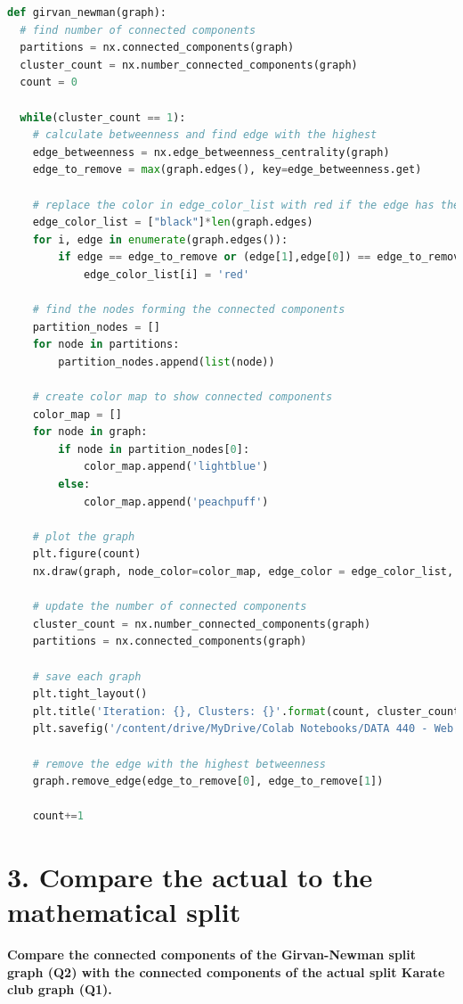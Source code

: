 \documentclass[12pt]{article}
\begin{document}
\begin{lstlisting}[language=Python, caption=Girvan-Newman algorithm function, label=lst:copy]
def girvan_newman(graph):
  # find number of connected components
  partitions = nx.connected_components(graph)
  cluster_count = nx.number_connected_components(graph)
  count = 0

  while(cluster_count == 1):
    # calculate betweenness and find edge with the highest
    edge_betweenness = nx.edge_betweenness_centrality(graph)
    edge_to_remove = max(graph.edges(), key=edge_betweenness.get)
    
    # replace the color in edge_color_list with red if the edge has the maximum betweenness:
    edge_color_list = ["black"]*len(graph.edges)
    for i, edge in enumerate(graph.edges()):
        if edge == edge_to_remove or (edge[1],edge[0]) == edge_to_remove:
            edge_color_list[i] = 'red'

    # find the nodes forming the connected components
    partition_nodes = []
    for node in partitions:
        partition_nodes.append(list(node))

    # create color map to show connected components
    color_map = []
    for node in graph:
        if node in partition_nodes[0]:
            color_map.append('lightblue')
        else: 
            color_map.append('peachpuff') 

    # plot the graph
    plt.figure(count)
    nx.draw(graph, node_color=color_map, edge_color = edge_color_list, with_labels=True)

    # update the number of connected components
    cluster_count = nx.number_connected_components(graph)
    partitions = nx.connected_components(graph)

    # save each graph
    plt.tight_layout()
    plt.title('Iteration: {}, Clusters: {}'.format(count, cluster_count))
    plt.savefig('/content/drive/MyDrive/Colab Notebooks/DATA 440 - Web Science/KC_GN{}.png'.format(count),bbox_inches='tight')

    # remove the edge with the highest betweenness 
    graph.remove_edge(edge_to_remove[0], edge_to_remove[1])

    count+=1
\end{lstlisting}

\section*{3. Compare the actual to the mathematical split}
\noindent \textbf{Compare the connected components of the Girvan-Newman split graph (Q2) with the connected components of the actual split Karate club graph (Q1).}
\end{document}
